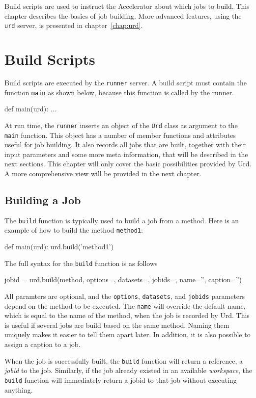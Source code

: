 \label{chap:urd_basic}

Build scripts are used to instruct the Accelerator about which jobs to
build.  This chapter describes the basics of job building.  More
advanced features, using the \texttt{urd} server, is presented in
chapter~\ref{chap:urd}.


\section{Build Scripts}
Build scripts are executed by the \texttt{runner} server.  A build
script must contain the function \texttt{main} as shown below, because
this function is called by the runner.
\begin{python}
def main(urd):
    ...
\end{python}
At run time, the \texttt{runner} inserts an object of the \texttt{Urd}
class as argument to the \texttt{main} function.  This object has a
number of member functions and attributes useful for job building.  It
also records all jobs that are built, together with their input
parameters and some more meta information, that will be described in
the next sections.  This chapter will only cover the basic
possibilities provided by Urd.  A more comprehensive view will be
provided in the next chapter.

\subsection{Building a Job}
The \texttt{build} function is typically used to build a job from a
method.  Here is an example of how to build the method
\texttt{method1}:
\begin{python}
def main(urd):
    urd.build('method1')
\end{python}
The full syntax for the \texttt{build} function is as follows
\begin{python}
jobid = urd.build(method, options={}, datasets={}, jobids={}, name='', caption='')
\end{python}
All paramters are optional, and
the \texttt{options}, \texttt{datasets}, and \texttt{jobids}
parameters depend on the method to be executed.  The \texttt{name}
will override the default name, which is equal to the name of the
method, when the job is recorded by Urd.  This is useful if several
jobs are build based on the same method.  Naming them uniquely makes
it easier to tell them apart later.  In addition, it is also possible
to assign a caption to a job.

When the job is successfully built, the \texttt{build} function will
return a reference, a \textsl{jobid} to the job.  Similarly, if the
job already existed in an available \textsl{workspace}, the
\texttt{build} function will immediately return a jobid to that job
without executing anything.


